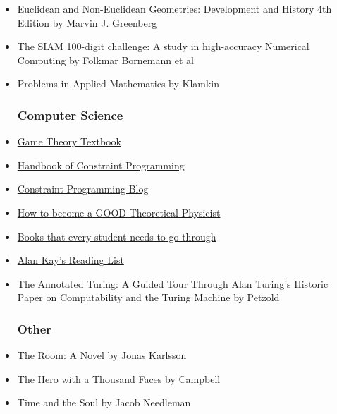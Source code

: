 \begin{itemize}
	\item Euclidean and Non-Euclidean Geometries: Development and History 4th Edition by Marvin J. Greenberg

	\item The SIAM 100-digit challenge: A study in high-accuracy Numerical Computing by Folkmar Bornemann et al

	\item Problems in Applied Mathematics by Klamkin

\subsubsection{Computer Science}

	\item  \href{http://arxiv.org/abs/1512.06808}{Game Theory Textbook}

	\item \href{http://cswww.essex.ac.uk/CSP/papers/CP_Handbook-20060315-final.pdf}{Handbook  of Constraint Programming}
	
	\item \href{http://www.hakank.org/constraint_programming_blog/}{Constraint
  Programming Blog}

	\item \href{http://www.staff.science.uu.nl/~gadda001/goodtheorist/index.html}{How to become a GOOD Theoretical Physicist}
  
	\item \href{http://math.stackexchange.com/questions/94827/books-that-every-student-need\%20s-to-go-through}{Books that every student needs to go through}

	\item \href{http://www.squeakland.org/resources/books/readingList.jsp}{Alan Kay's Reading List}

	\item The Annotated Turing: A Guided Tour Through Alan Turing's Historic
Paper on Computability and the Turing Machine by Petzold


\subsubsection{Other}

	\item The Room: A Novel by Jonas Karlsson

	\item The Hero with a Thousand Faces by Campbell

	\item Time and the Soul by Jacob Needleman


\end{itemize}
